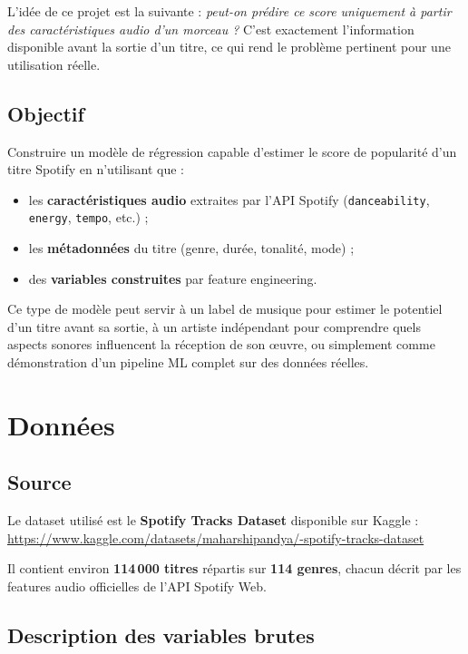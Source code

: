 \documentclass[12pt, a4paper]{article}
\begin{document}
L'idée de ce projet est la suivante : \textit{peut-on prédire ce score uniquement à partir
des caractéristiques audio d'un morceau ?} C'est exactement l'information disponible
avant la sortie d'un titre, ce qui rend le problème pertinent pour une utilisation réelle.

\subsection{Objectif}

Construire un modèle de régression capable d'estimer le score de popularité d'un titre
Spotify en n'utilisant que :
\begin{itemize}[leftmargin=1.5cm]
  \item les \textbf{caractéristiques audio} extraites par l'API Spotify
        (\texttt{danceability}, \texttt{energy}, \texttt{tempo}, etc.) ;
  \item les \textbf{métadonnées} du titre (genre, durée, tonalité, mode) ;
  \item des \textbf{variables construites} par feature engineering.
\end{itemize}

\begin{infobox}
Ce type de modèle peut servir à un label de musique pour estimer le potentiel d'un
titre avant sa sortie, à un artiste indépendant pour comprendre quels aspects sonores
influencent la réception de son œuvre, ou simplement comme démonstration d'un pipeline
ML complet sur des données réelles.
\end{infobox}

\section{Données}

\subsection{Source}

Le dataset utilisé est le \textbf{Spotify Tracks Dataset} disponible sur Kaggle :
\url{https://www.kaggle.com/datasets/maharshipandya/-spotify-tracks-dataset}

Il contient environ \textbf{114\,000 titres} répartis sur \textbf{114 genres}, chacun
décrit par les features audio officielles de l'API Spotify Web.

\subsection{Description des variables brutes}
\end{document}
